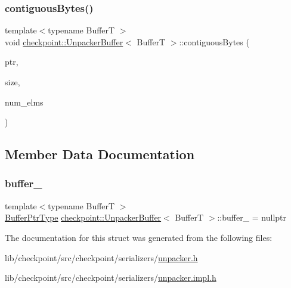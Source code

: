 \subsubsection{\texorpdfstring{contiguous\+Bytes()}{contiguousBytes()}}
{\footnotesize\ttfamily template$<$typename BufferT $>$ \\
void \hyperlink{structcheckpoint_1_1_unpacker_buffer}{checkpoint\+::\+Unpacker\+Buffer}$<$ BufferT $>$\+::contiguous\+Bytes (\begin{DoxyParamCaption}\item[{void $\ast$}]{ptr,  }\item[{\hyperlink{namespacecheckpoint_a083f6674da3f94c2901b18c6d238217c}{Serial\+Size\+Type}}]{size,  }\item[{\hyperlink{namespacecheckpoint_a083f6674da3f94c2901b18c6d238217c}{Serial\+Size\+Type}}]{num\+\_\+elms }\end{DoxyParamCaption})}



\subsection{Member Data Documentation}
\mbox{\label{structcheckpoint_1_1_unpacker_buffer_a0e10a816952c340efd057727e91fe6fa}} 
\subsubsection{\texorpdfstring{buffer\+\_\+}{buffer\_}}
{\footnotesize\ttfamily template$<$typename BufferT $>$ \\
\hyperlink{structcheckpoint_1_1_unpacker_buffer_acdd2460fdb60fc584e04cb4069060613}{Buffer\+Ptr\+Type} \hyperlink{structcheckpoint_1_1_unpacker_buffer}{checkpoint\+::\+Unpacker\+Buffer}$<$ BufferT $>$\+::buffer\+\_\+ = nullptr\hspace{0.3cm}{\ttfamily [private]}}



The documentation for this struct was generated from the following files\+:\begin{DoxyCompactItemize}
\item 
lib/checkpoint/src/checkpoint/serializers/\hyperlink{unpacker_8h}{unpacker.\+h}\item 
lib/checkpoint/src/checkpoint/serializers/\hyperlink{unpacker_8impl_8h}{unpacker.\+impl.\+h}\end{DoxyCompactItemize}
